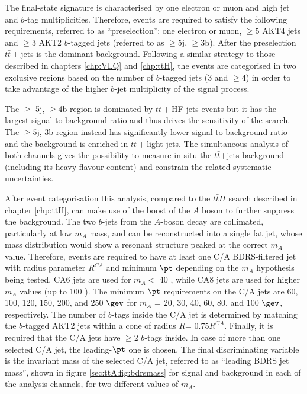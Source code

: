 The final-state signature is characterised by one electron or muon and high jet and $b$-tag multiplicities. Therefore, events are required to satisfy the following requirements, referred to as ``preselection'': one electron or muon, $\ge5$ AKT4 jets and $\ge3$ AKT2 $b$-tagged jets (referred to as $\ge$5j, $\ge$3b). After the preselection $t\bar{t}+$jets is the dominant background. Following a similar strategy to those described in chapters \ref{chp:VLQ} and \ref{chp:ttH}, the events are categorised in two exclusive regions based on the number of $b$-tagged jets (3 and $\ge$4) in order to take advantage of the higher $b$-jet multiplicity of the signal process. \par The $\ge$ 5j, $\ge$4b region is dominated by $t\bar{t}+$HF-jets events but it  has the largest signal-to-background ratio and thus drives the sensitivity of the search.
The $\ge5$j, $3$b region instead has significantly lower signal-to-background ratio and the background is enriched in $t\bar{t}+$light-jets.
The simultaneous analysis of both channels gives the possibility to measure in-situ the $t\bar{t}$+jets background (including its heavy-flavour content) and constrain the related systematic uncertainties.\par
After event categorisation this analysis, compared to the $t\bar{t}H$ search described in chapter \ref{chp:ttH}, can make use of the boost of the $A$ boson to further suppress the background. The two $b$-jets from the $A$-boson decay are collimated, particularly at low $m_{A}$ mass, and can be reconstructed into a single fat jet, whose mass distribution would show a resonant structure peaked at the correct $m_{A}$ value. Therefore, events are required to have at least one C/A BDRS-filtered jet with radius parameter $R^{CA}$ and minimum $\pt$ depending on the $m_{A}$ hypothesis being tested. CA6 jets are used for $m_{A}<$ 40 \gev, while CA8 jets are used for higher $m_{A}$ values (up to 100 \gev). The minimum $\pt$ requirements on the C/A jets are 60, 100, 120, 150, 200, and 250 $\gev$ for $m_{A}$ = 20, 30, 40, 60, 80, and 100 $\gev$, respectively. The number of $b$-tags inside the C/A jet is determined by matching the $b$-tagged AKT2 jets within a cone of radius $R$= 0.75$R^{CA}$. Finally, it is required that the C/A jets have $\ge2$ $b$-tags inside. In case of more than one selected C/A jet, the leading-$\pt$ one is chosen. The final discriminating variable is the invariant mass of the selected C/A jet, referred to as ``leading BDRS jet mass'', shown in figure \ref{sec:ttA:fig:bdrsmass} for signal and background in each of the analysis channels, for two different values of $m_{A}$.


